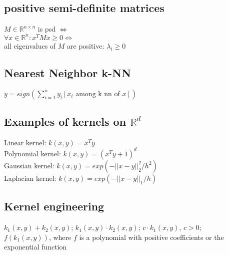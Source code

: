\subsection*{positive semi-definite matrices}
$M \in \mathbb{R}^{n\times n}$ is psd $\Leftrightarrow$\\
$\forall x \in \mathbb{R}^n: x^TMx \geq 0 \Leftrightarrow$\\
all eigenvalues of $M$ are positive: $\lambda_i\geq 0$

\subsection*{Nearest Neighbor k-NN}
$y=sign(\sum_{i=1}^n y_i [x_i \text{ among k nn of } x])$

\subsection*{Examples of kernels on $\mathbb{R}^d$}
Linear kernel: $k(x,y)=x^T y$\\
Polynomial kernel: $k(x,y)=(x^T y + 1)^d$\\
Gaussian kernel: $k(x,y) = exp(-||x-y||_2^2/h^2)$\\
Laplacian kernel: $k(x,y) = exp(-||x-y||_1/h)$


\subsection*{Kernel engineering}
$k_1(x,y) + k_2(x,y)$; $k_1(x,y) \cdot k_2(x,y)$; $c \cdot k_1(x,y)$, $c>0$;\\
$f(k_1(x,y))$, where $f$ is a polynomial with positive coefficients or the exponential function

\iffalse
\subsection*{Parametric vs. Nonparametric}
\emph{Parametric}: have finite set of parameters\\
E.g. linear regression, linear perceptron,...\\
\emph{Nonparametric}: grow in complexity with the size of the data\\
E.g. kernelized Perceptron, k-NN,...
\fi

